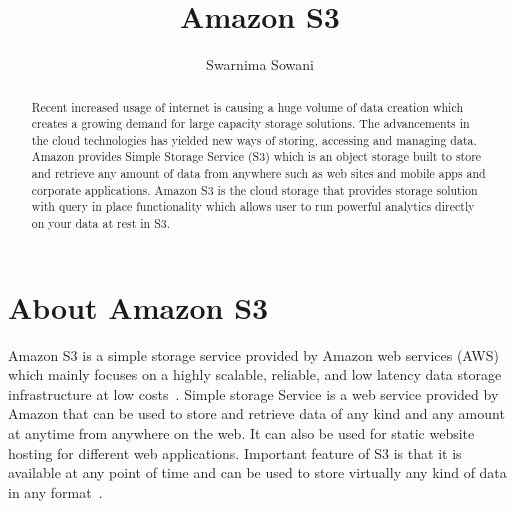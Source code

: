 
\title{Amazon S3}


\author{Swarnima Sowani}


\renewcommand{\shortauthors}{G. v. Laszewski}

\begin{abstract}

Recent increased usage of internet is causing a huge volume of data creation
which creates a growing demand for large capacity storage solutions. The
advancements in the cloud technologies has yielded new ways of storing,
accessing and managing data. Amazon provides Simple Storage Service (S3) 
which is an object storage built to store and retrieve any amount
of data from anywhere such as web sites and mobile apps and corporate
applications. Amazon S3 is the cloud storage that provides storage solution
with query in place functionality which allows user to run powerful analytics
directly on your data at rest in S3.

\end{abstract}


\maketitle

\section{About Amazon S3}

Amazon S3 is a simple storage service provided by Amazon web services (AWS)
which mainly focuses on a highly scalable, reliable, and low latency data
storage infrastructure at low costs~\cite{hid-sp18-420-amazon-S3-FAQ}. Simple
storage Service is a web service provided by Amazon that can be used to store
and retrieve data of any kind and any amount at anytime from anywhere on the
web. It can also be used for static website hosting for different web
applications. Important feature of S3 is that it is available at any point of
time and can be used to store virtually any kind of data in any
format~\cite{hid-sp18-420-amazon-S3-FAQ}.

